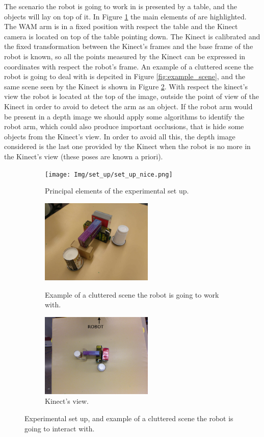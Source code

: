The scenario the robot is going to work in is presented by a table, and the objects will lay on top of it. In Figure \ref{fig:setup_} the main elements of are highlighted. The WAM arm is in a fixed position with respect the table and the Kinect camera is located on top of the table pointing down. The Kinect is calibrated and the fixed transformation between the Kinect's frames and the base frame of the robot is known, so all the points measured by the Kinect can be expressed in coordinates with respect the robot's frame. An example of a cluttered scene the robot is going to deal with is depcited in Figure \ref{fig:example_scene}, and the same scene seen by the Kinect is shown in Figure \ref{fig:kinect_view}. With respect the kinect's view the robot is located at the top of the image, outside the point of view of the Kinect in order to avoid to detect the arm as an object. If the robot arm would be present in a depth image we should apply some algorithms to identify the robot arm, which could also produce important occlusions, that is hide some objects from the Kinect's view. In order to avoid all this, the depth image considered is the last one provided by the Kinect when the robot is no more in the Kinect's view (these poses are known a priori). 

\begin{figure}[htp]
\centering
\begin{subfigure}[b]{0.4\textwidth}
\texttt{[image: Img/set\_up/set\_up\_nice.png]}
\caption{Principal elements of the experimental set up.}\label{fig:setup_}
\end{subfigure}
\qquad \qquad 
\begin{subfigure}[b]{0.4\textwidth}
\centering
\includegraphics[height=4cm]{Img/set_up/example_setup.jpg}
\caption{Example of a cluttered scene the robot is going to work with.}\label{fig:example_scene}
\vspace{2ex}
\includegraphics[height=4cm]{Img/set_up/view_kinect.png}
\caption{Kinect's view.}\label{fig:kinect_view}
\end{subfigure}
\caption{Experimental set up, and example of a cluttered scene the robot is going to interact with.}
\label{fig:setup}
\end{figure}


